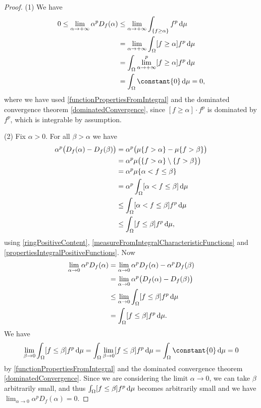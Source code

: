 \begin{proof}
(1) We have
\begin{align*}
0 \leq \lim_{\alpha \to +\infty}\alpha^p D_f(\alpha) &\leq \lim_{\alpha \to +\infty}\int_{\{f \geq \alpha\}} f^p\diff{\mu} \\
&= \lim_{\alpha \to +\infty}\int_\Omega [f \geq \alpha] f^p\diff{\mu} \\
&= \int_\Omega \lim^p_{\alpha \to +\infty}[f \geq \alpha] f^p\diff{\mu} \\
&= \int_\Omega \constant{0}\diff{\mu} = 0,
\end{align*}
where we have used \ref{functionPropertiesFromIntegral} and the dominated convergence theorem \ref{dominatedConvergence}, since $[f \geq \alpha]\cdot f^p$ is dominated by $f^p$, which is integrable by assumption.

(2) Fix $\alpha > 0$. For all $\beta > \alpha$ we have
\begin{align*}
\alpha^p\big(D_f(\alpha) - D_f(\beta)\big) &= \alpha^p\big(\mu\{f > \alpha\} - \mu\{f >\beta\}\big) \\
&= \alpha^p\mu\big(\{f > \alpha\} \setminus \{f >\beta\}\big) \\
&= \alpha^p\mu\{\alpha < f \leq \beta\} \\
&= \alpha^p\int_\Omega[\alpha < f \leq \beta]\operatorname{d \!}{\mu} \\
&\leq \int_\Omega[\alpha < f \leq \beta]f^p\operatorname{d \!}{\mu} \\
&\leq \int_\Omega[f \leq \beta]f^p\operatorname{d \!}{\mu},
\end{align*}
using \ref{ringPositiveContent}, \ref{measureFromIntegralCharacteristicFunctions} and \ref{propertiesIntegralPositiveFunctions}. Now
\begin{align*}
\lim_{\alpha\to 0}\alpha^p D_f(\alpha) &= \lim_{\alpha\to 0}\alpha^p D_f(\alpha) - \alpha^p D_f(\beta) \\
&= \lim_{\alpha\to 0}\alpha^p \big(D_f(\alpha) - D_f(\beta)\big) \\
&\leq \lim_{\alpha\to 0} \int_\Omega[f \leq \beta]f^p\operatorname{d \!}{\mu} \\
&= \int_\Omega[f \leq \beta]f^p\operatorname{d \!}{\mu}.
\end{align*}
We have
\[ \lim_{\beta\to 0}\int_\Omega[f \leq \beta]f^p\diff{\mu} = \int_\Omega\lim_{\beta\to 0}[f \leq \beta]f^p\diff{\mu} = \int_\Omega \constant{0}\diff{\mu} = 0 \]
by \ref{functionPropertiesFromIntegral} and the dominated convergence theorem \ref{dominatedConvergence}. Since we are considering the limit $\alpha \to 0$, we can take $\beta$ arbitrarily small, and thus $\int_\Omega[f \leq \beta]f^p\operatorname{d \!}{\mu}$ becomes arbitrarily small and we have $\lim_{\alpha \to 0}\alpha^p D_f(\alpha) = 0$.
\end{proof}

